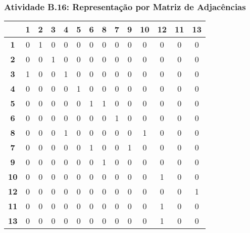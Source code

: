 \documentclass[a4paper,12pt]{article}
\begin{document}
\subsubsection*{Atividade B.16: Representação por Matriz de Adjacências}
\begin{center}
\scriptsize 
\begin{tabular*}{\textwidth}{c|@{\extracolsep{\fill}}ccccccccccccc}
\rowcolor[gray]{0.9}
 & \textbf{1} & \textbf{2} & \textbf{3} & \textbf{4} & \textbf{5} & \textbf{6} & \textbf{8} & \textbf{7} & \textbf{9} & \textbf{10} & \textbf{12} & \textbf{11} & \textbf{13} \\
\hline
\textbf{1} & 0 & 1 & 0 & 0 & 0 & 0 & 0 & 0 & 0 & 0 & 0 & 0 & 0 \\
\textbf{2} & 0 & 0 & 1 & 0 & 0 & 0 & 0 & 0 & 0 & 0 & 0 & 0 & 0 \\
\textbf{3} & 1 & 0 & 0 & 1 & 0 & 0 & 0 & 0 & 0 & 0 & 0 & 0 & 0 \\
\textbf{4} & 0 & 0 & 0 & 0 & 1 & 0 & 0 & 0 & 0 & 0 & 0 & 0 & 0 \\
\textbf{5} & 0 & 0 & 0 & 0 & 0 & 1 & 1 & 0 & 0 & 0 & 0 & 0 & 0 \\
\textbf{6} & 0 & 0 & 0 & 0 & 0 & 0 & 0 & 1 & 0 & 0 & 0 & 0 & 0 \\
\textbf{8} & 0 & 0 & 0 & 1 & 0 & 0 & 0 & 0 & 0 & 1 & 0 & 0 & 0 \\
\textbf{7} & 0 & 0 & 0 & 0 & 0 & 1 & 0 & 0 & 1 & 0 & 0 & 0 & 0 \\
\textbf{9} & 0 & 0 & 0 & 0 & 0 & 0 & 1 & 0 & 0 & 0 & 0 & 0 & 0 \\
\textbf{10} & 0 & 0 & 0 & 0 & 0 & 0 & 0 & 0 & 0 & 0 & 1 & 0 & 0 \\
\textbf{12} & 0 & 0 & 0 & 0 & 0 & 0 & 0 & 0 & 0 & 0 & 0 & 0 & 1 \\
\textbf{11} & 0 & 0 & 0 & 0 & 0 & 0 & 0 & 0 & 0 & 0 & 1 & 0 & 0 \\
\textbf{13} & 0 & 0 & 0 & 0 & 0 & 0 & 0 & 0 & 0 & 0 & 1 & 0 & 0 \\
\end{tabular*}
\end{center}
\end{document}
